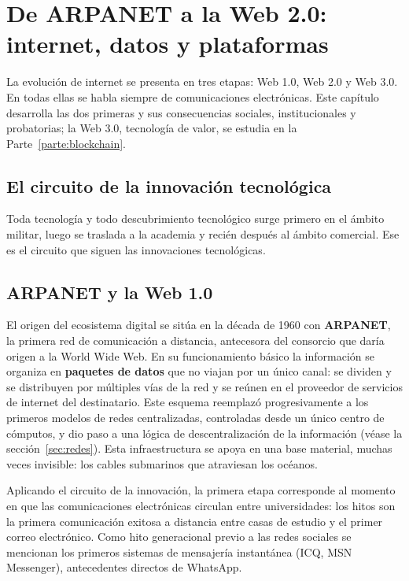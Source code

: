 \documentclass[12pt,oneside]{book}
\begin{document}
\chapter{De ARPANET a la Web 2.0: internet, datos y plataformas}
\label{cap:web}

La evolución de internet se presenta en tres etapas: Web 1.0, Web 2.0 y Web 3.0. En todas ellas se habla siempre de comunicaciones electrónicas. Este capítulo desarrolla las dos primeras y sus consecuencias sociales, institucionales y probatorias; la Web 3.0, tecnología de valor, se estudia en la Parte~\ref{parte:blockchain}.

\section{El circuito de la innovación tecnológica}

\begin{important}
Toda tecnología y todo descubrimiento tecnológico surge primero en el ámbito militar, luego se traslada a la academia y recién después al ámbito comercial. Ese es el circuito que siguen las innovaciones tecnológicas.
\end{important}

\section{ARPANET y la Web 1.0}

El origen del ecosistema digital se sitúa en la década de 1960 con \textbf{ARPANET}, la primera red de comunicación a distancia, antecesora del consorcio que daría origen a la World Wide Web. En su funcionamiento básico la información se organiza en \textbf{paquetes de datos} que no viajan por un único canal: se dividen y se distribuyen por múltiples vías de la red y se reúnen en el proveedor de servicios de internet del destinatario. Este esquema reemplazó progresivamente a los primeros modelos de redes centralizadas, controladas desde un único centro de cómputos, y dio paso a una lógica de descentralización de la información (véase la sección~\ref{sec:redes}). Esta infraestructura se apoya en una base material, muchas veces invisible: los cables submarinos que atraviesan los océanos.

Aplicando el circuito de la innovación, la primera etapa corresponde al momento en que las comunicaciones electrónicas circulan entre universidades: los hitos son la primera comunicación exitosa a distancia entre casas de estudio y el primer correo electrónico. Como hito generacional previo a las redes sociales se mencionan los primeros sistemas de mensajería instantánea (ICQ, MSN Messenger), antecedentes directos de WhatsApp.
\end{document}
